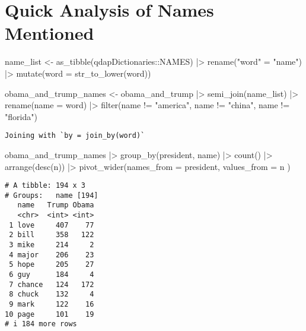 \documentclass[
  letterpaper,
  DIV=11,
  numbers=noendperiod]{scrartcl}
\newenvironment{Shaded}{\begin{snugshade}}{\end{snugshade}}
\newcommand{\AttributeTok}[1]{\textcolor[rgb]{0.40,0.45,0.13}{#1}}
\newcommand{\FunctionTok}[1]{\textcolor[rgb]{0.28,0.35,0.67}{#1}}
\newcommand{\NormalTok}[1]{\textcolor[rgb]{0.00,0.23,0.31}{#1}}
\newcommand{\OtherTok}[1]{\textcolor[rgb]{0.00,0.23,0.31}{#1}}
\newcommand{\SpecialCharTok}[1]{\textcolor[rgb]{0.37,0.37,0.37}{#1}}
\newcommand{\StringTok}[1]{\textcolor[rgb]{0.13,0.47,0.30}{#1}}
\begin{document}
\section{Quick Analysis of Names
Mentioned}\label{quick-analysis-of-names-mentioned}

\begin{Shaded}
\begin{Highlighting}[]
\NormalTok{name\_list }\OtherTok{\textless{}{-}} \FunctionTok{as\_tibble}\NormalTok{(qdapDictionaries}\SpecialCharTok{::}\NormalTok{NAMES) }\SpecialCharTok{|\textgreater{}}
  \FunctionTok{rename}\NormalTok{(}\StringTok{"word"} \OtherTok{=} \StringTok{"name"}\NormalTok{) }\SpecialCharTok{|\textgreater{}}
  \FunctionTok{mutate}\NormalTok{(}\AttributeTok{word =} \FunctionTok{str\_to\_lower}\NormalTok{(word))}

\NormalTok{obama\_and\_trump\_names }\OtherTok{\textless{}{-}}\NormalTok{ obama\_and\_trump }\SpecialCharTok{|\textgreater{}}
  \FunctionTok{semi\_join}\NormalTok{(name\_list) }\SpecialCharTok{|\textgreater{}}
  \FunctionTok{rename}\NormalTok{(}\AttributeTok{name =}\NormalTok{ word) }\SpecialCharTok{|\textgreater{}}
  \FunctionTok{filter}\NormalTok{(name }\SpecialCharTok{!=} \StringTok{"america"}\NormalTok{, name }\SpecialCharTok{!=} \StringTok{"china"}\NormalTok{, name }\SpecialCharTok{!=} \StringTok{"florida"}\NormalTok{)}
\end{Highlighting}
\end{Shaded}

\begin{verbatim}
Joining with `by = join_by(word)`
\end{verbatim}

\begin{Shaded}
\begin{Highlighting}[]
\NormalTok{obama\_and\_trump\_names }\SpecialCharTok{|\textgreater{}} 
  \FunctionTok{group\_by}\NormalTok{(president, name) }\SpecialCharTok{|\textgreater{}}
  \FunctionTok{count}\NormalTok{() }\SpecialCharTok{|\textgreater{}}
  \FunctionTok{arrange}\NormalTok{(}\FunctionTok{desc}\NormalTok{(n)) }\SpecialCharTok{|\textgreater{}}
  \FunctionTok{pivot\_wider}\NormalTok{(}\AttributeTok{names\_from =}\NormalTok{ president, }\AttributeTok{values\_from =}\NormalTok{ n ) }
\end{Highlighting}
\end{Shaded}

\begin{verbatim}
# A tibble: 194 x 3
# Groups:   name [194]
   name   Trump Obama
   <chr>  <int> <int>
 1 love     407    77
 2 bill     358   122
 3 mike     214     2
 4 major    206    23
 5 hope     205    27
 6 guy      184     4
 7 chance   124   172
 8 chuck    132     4
 9 mark     122    16
10 page     101    19
# i 184 more rows
\end{verbatim}
\end{document}
